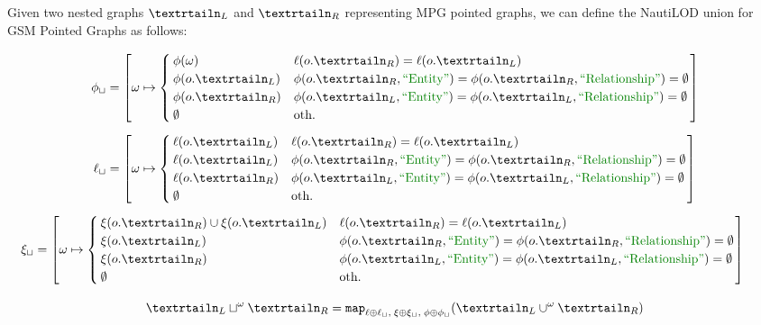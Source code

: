 \begin{definition}
	Given two nested graphs $\nested_L$ and $\nested_R$ representing MPG pointed graphs, we can define the NautiLOD  union for GSM  Pointed Graphs as follows:
	
	\[\phi_{\sqcup} = \left[\omega\mapsto \begin{cases}
	\phi(\omega) & \ell(o.\nested_R)=\ell(o.\nested_L)\\
	\phi(o.\nested_L) & \phi(o.\nested_R,\ONTA)=\phi(o.\nested_R,\RELA)=\emptyset\\
	\phi(o.\nested_R) & \phi(o.\nested_L,\ONTA)=\phi(o.\nested_L,\RELA)=\emptyset\\
	\emptyset & \textup{oth.}\\
	\end{cases}\right]\]
	\[\ell_\sqcup = \left[\omega\mapsto\begin{cases}
	\ell(o.\nested_L) & \ell(o.\nested_R)=\ell(o.\nested_L) \\
	\ell(o.\nested_L) & \phi(o.\nested_R,\ONTA)=\phi(o.\nested_R,\RELA)=\emptyset\\
	\ell(o.\nested_R) & \phi(o.\nested_L,\ONTA)=\phi(o.\nested_L,\RELA)=\emptyset\\
	\emptyset & \textup{oth.} \\
	\end{cases}\right]\]
	\[ \xi_\sqcup = \left[\omega\mapsto\begin{cases}
	\xi(o.\nested_R)\cup \xi(o.\nested_L) & \ell(o.\nested_R)=\ell(o.\nested_L) \\
	\xi(o.\nested_L) & \phi(o.\nested_R,\ONTA)=\phi(o.\nested_R,\RELA)=\emptyset\\
	\xi(o.\nested_R) & \phi(o.\nested_L,\ONTA)=\phi(o.\nested_L,\RELA)=\emptyset\\
	\emptyset & \textup{oth.} \\
	\end{cases}\right]\qquad\]
	
	
	\[\nested_L \sqcup^\omega \nested_R = \texttt{map}_{\ell\oplus \ell_\sqcup,\;\xi\oplus \xi_\sqcup,\;\phi\oplus \phi_\sqcup}(\nested_L \cup^\omega \nested_R)\] 
\end{definition}

